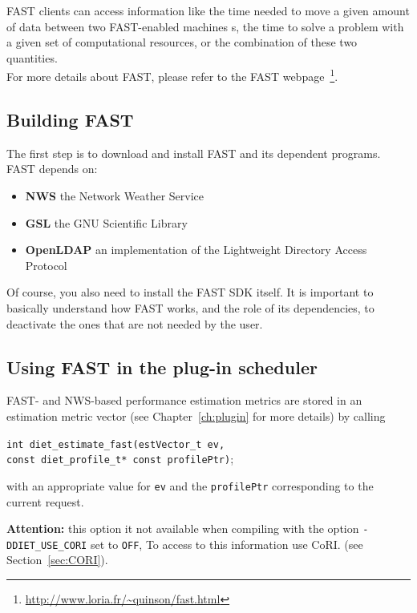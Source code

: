 FAST clients can access information like the time needed to move a
given amount of data between two FAST-enabled machines {\sed}s, the
time to solve a problem with a given set of computational resources,
or the combination of these two quantities.\\

For more details about FAST, please refer to the FAST
webpage~\footnote{\url{http://www.loria.fr/~quinson/fast.html}}.

\subsection{Building FAST}

The first step is to download and install FAST and its
dependent programs.  FAST depends on:
\begin{itemize}
 \item{\textbf{NWS}} the Network Weather Service
 \item{\textbf{GSL}} the GNU Scientific Library
 \item{\textbf{OpenLDAP}} an implementation of the Lightweight
                          Directory Access Protocol
\end{itemize}
Of course, you also need to install the FAST SDK itself. It is important to
 basically understand how FAST works, and the role of its dependencies, to
deactivate the ones that are not needed by the user.

\subsection{Using FAST in the plug-in scheduler}\label{subsection:callFAST}

FAST- and NWS-based performance estimation metrics are stored in
  an estimation metric vector (see Chapter~\ref{ch:plugin} for more details) by calling
  \begin{tabbing}
    \texttt{int diet\_estimate\_fast(}\=\texttt{estVector\_t ev,} \\
    \> \texttt{const diet\_profile\_t* const profilePtr)};
  \end{tabbing}
   with an appropriate value for \texttt{ev} and the
   \texttt{profilePtr} corresponding to the current \diet request.

   \textbf{Attention: } this option it not available when compiling 
   with the option \texttt{-DDIET\_USE\_CORI} set to \texttt{OFF}, 
   To access to this information use CoRI.
   (see Section~\ref{sec:CORI}).

